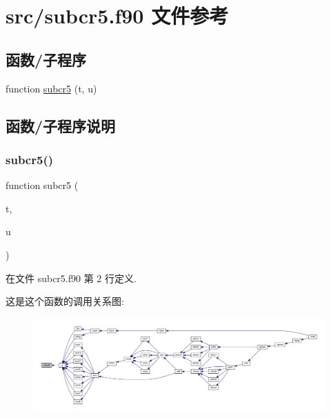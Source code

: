 \hypertarget{subcr5_8f90}{}\section{src/subcr5.f90 文件参考}
\label{subcr5_8f90}
\subsection*{函数/子程序}
\begin{DoxyCompactItemize}
\item 
function \mbox{\hyperlink{subcr5_8f90_aadca1379d33ff6370c301a19b87caf47}{subcr5}} (t, u)
\end{DoxyCompactItemize}


\subsection{函数/子程序说明}
\mbox{\label{subcr5_8f90_aadca1379d33ff6370c301a19b87caf47}} 
\subsubsection{\texorpdfstring{subcr5()}{subcr5()}}
{\footnotesize\ttfamily function subcr5 (\begin{DoxyParamCaption}\item[{}]{t,  }\item[{}]{u }\end{DoxyParamCaption})}



在文件 subcr5.\+f90 第 2 行定义.

这是这个函数的调用关系图\+:
\nopagebreak
\begin{figure}[H]
\begin{center}
\leavevmode
\includegraphics[width=350pt]{subcr5_8f90_aadca1379d33ff6370c301a19b87caf47_icgraph}
\end{center}
\end{figure}

